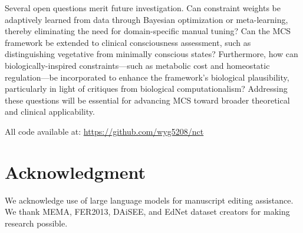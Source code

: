 \documentclass[10pt,journal,compsoc]{IEEEtran}
\begin{document}
Several open questions merit future investigation. Can constraint weights be adaptively learned from data through Bayesian optimization or meta-learning, thereby eliminating the need for domain-specific manual tuning? Can the MCS framework be extended to clinical consciousness assessment, such as distinguishing vegetative from minimally conscious states? Furthermore, how can biologically-inspired constraints—such as metabolic cost and homeostatic regulation—be incorporated to enhance the framework's biological plausibility, particularly in light of critiques from biological computationalism? Addressing these questions will be essential for advancing MCS toward broader theoretical and clinical applicability.

All code available at: \url{https://github.com/wyg5208/nct}

\section*{Acknowledgment}

We acknowledge use of large language models for manuscript editing assistance. We thank MEMA, FER2013, DAiSEE, and EdNet dataset creators for making research possible.

\ifCLASSOPTIONcaptionsoff
  \newpage
\fi
\end{document}
